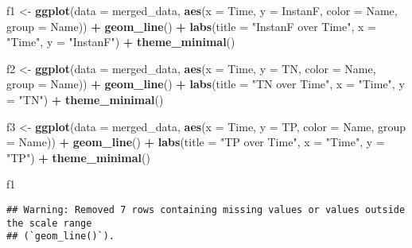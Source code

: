 \documentclass[
]{article}
\newenvironment{Shaded}{\begin{snugshade}}{\end{snugshade}}
\newcommand{\AttributeTok}[1]{\textcolor[rgb]{0.13,0.29,0.53}{#1}}
\newcommand{\FunctionTok}[1]{\textcolor[rgb]{0.13,0.29,0.53}{\textbf{#1}}}
\newcommand{\NormalTok}[1]{#1}
\newcommand{\OtherTok}[1]{\textcolor[rgb]{0.56,0.35,0.01}{#1}}
\newcommand{\SpecialCharTok}[1]{\textcolor[rgb]{0.81,0.36,0.00}{\textbf{#1}}}
\newcommand{\StringTok}[1]{\textcolor[rgb]{0.31,0.60,0.02}{#1}}
\begin{document}
\begin{Shaded}
\begin{Highlighting}[]
\NormalTok{f1 }\OtherTok{\textless{}{-}} \FunctionTok{ggplot}\NormalTok{(}\AttributeTok{data =}\NormalTok{ merged\_data, }\FunctionTok{aes}\NormalTok{(}\AttributeTok{x =}\NormalTok{ Time, }\AttributeTok{y =}\NormalTok{ InstanF, }\AttributeTok{color =}\NormalTok{ Name, }\AttributeTok{group =}\NormalTok{ Name)) }\SpecialCharTok{+}
  \FunctionTok{geom\_line}\NormalTok{() }\SpecialCharTok{+}
  \FunctionTok{labs}\NormalTok{(}\AttributeTok{title =} \StringTok{"InstanF over Time"}\NormalTok{, }\AttributeTok{x =} \StringTok{"Time"}\NormalTok{, }\AttributeTok{y =} \StringTok{"InstanF"}\NormalTok{) }\SpecialCharTok{+}
  \FunctionTok{theme\_minimal}\NormalTok{()}

\NormalTok{f2 }\OtherTok{\textless{}{-}} \FunctionTok{ggplot}\NormalTok{(}\AttributeTok{data =}\NormalTok{ merged\_data, }\FunctionTok{aes}\NormalTok{(}\AttributeTok{x =}\NormalTok{ Time, }\AttributeTok{y =}\NormalTok{ TN, }\AttributeTok{color =}\NormalTok{ Name, }\AttributeTok{group =}\NormalTok{ Name)) }\SpecialCharTok{+}
  \FunctionTok{geom\_line}\NormalTok{() }\SpecialCharTok{+}
  \FunctionTok{labs}\NormalTok{(}\AttributeTok{title =} \StringTok{"TN over Time"}\NormalTok{, }\AttributeTok{x =} \StringTok{"Time"}\NormalTok{, }\AttributeTok{y =} \StringTok{"TN"}\NormalTok{) }\SpecialCharTok{+}
  \FunctionTok{theme\_minimal}\NormalTok{()}

\NormalTok{f3 }\OtherTok{\textless{}{-}} \FunctionTok{ggplot}\NormalTok{(}\AttributeTok{data =}\NormalTok{ merged\_data, }\FunctionTok{aes}\NormalTok{(}\AttributeTok{x =}\NormalTok{ Time, }\AttributeTok{y =}\NormalTok{ TP, }\AttributeTok{color =}\NormalTok{ Name, }\AttributeTok{group =}\NormalTok{ Name)) }\SpecialCharTok{+}
  \FunctionTok{geom\_line}\NormalTok{() }\SpecialCharTok{+}
  \FunctionTok{labs}\NormalTok{(}\AttributeTok{title =} \StringTok{"TP over Time"}\NormalTok{, }\AttributeTok{x =} \StringTok{"Time"}\NormalTok{, }\AttributeTok{y =} \StringTok{"TP"}\NormalTok{) }\SpecialCharTok{+}
  \FunctionTok{theme\_minimal}\NormalTok{()}

\NormalTok{f1}
\end{Highlighting}
\end{Shaded}

\begin{verbatim}
## Warning: Removed 7 rows containing missing values or values outside the scale range
## (`geom_line()`).
\end{verbatim}
\end{document}
